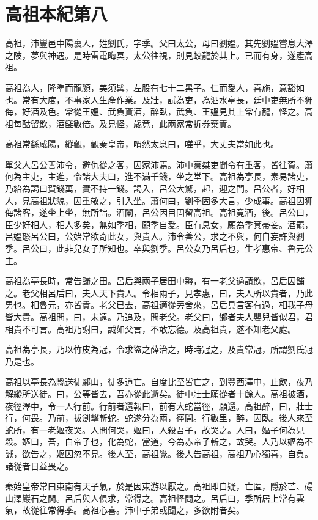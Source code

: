 \chapter{高祖本紀第八}

高祖，沛豐邑中陽裏人，姓劉氏，字季。父曰太公，母曰劉媼。其先劉媼嘗息大澤之陂，夢與神遇。是時雷電晦冥，太公往視，則見蛟龍於其上。已而有身，遂產高祖。

高祖為人，隆準而龍顏，美須髯，左股有七十二黑子。仁而愛人，喜施，意豁如也。常有大度，不事家人生產作業。及壯，試為吏，為泗水亭長，廷中吏無所不狎侮，好酒及色。常從王媼、武負貰酒，醉臥，武負、王媼見其上常有龍，怪之。高祖每酤留飲，酒讎數倍。及見怪，歲竟，此兩家常折券棄責。

高祖常繇咸陽，縱觀，觀秦皇帝，喟然太息曰，嗟乎，大丈夫當如此也。

單父人呂公善沛令，避仇從之客，因家沛焉。沛中豪桀吏聞令有重客，皆往賀。蕭何為主吏，主進，令諸大夫曰，進不滿千錢，坐之堂下。高祖為亭長，素易諸吏，乃紿為謁曰賀錢萬，實不持一錢。謁入，呂公大驚，起，迎之門。呂公者，好相人，見高祖狀貌，因重敬之，引入坐。蕭何曰，劉季固多大言，少成事。高祖因狎侮諸客，遂坐上坐，無所詘。酒闌，呂公因目固留高祖。高祖竟酒，後。呂公曰，臣少好相人，相人多矣，無如季相，願季自愛。臣有息女，願為季箕帚妾。酒罷，呂媼怒呂公曰，公始常欲奇此女，與貴人。沛令善公，求之不與，何自妄許與劉季。呂公曰，此非兒女子所知也。卒與劉季。呂公女乃呂后也，生孝惠帝、魯元公主。

高祖為亭長時，常告歸之田。呂后與兩子居田中耨，有一老父過請飲，呂后因餔之。老父相呂后曰，夫人天下貴人。令相兩子，見孝惠，曰，夫人所以貴者，乃此男也。相魯元，亦皆貴。老父已去，高祖適從旁舍來，呂后具言客有過，相我子母皆大貴。高祖問，曰，未遠。乃追及，問老父。老父曰，鄉者夫人嬰兒皆似君，君相貴不可言。高祖乃謝曰，誠如父言，不敢忘德。及高祖貴，遂不知老父處。

高祖為亭長，乃以竹皮為冠，令求盜之薛治之，時時冠之，及貴常冠，所謂劉氏冠乃是也。

高祖以亭長為縣送徒酈山，徒多道亡。自度比至皆亡之，到豐西澤中，止飲，夜乃解縱所送徒。曰，公等皆去，吾亦從此逝矣。徒中壯士願從者十餘人。高祖被酒，夜徑澤中，令一人行前。行前者還報曰，前有大蛇當徑，願還。高祖醉，曰，壯士行，何畏。乃前，拔劍擊斬蛇。蛇遂分為兩，徑開。行數里，醉，因臥。後人來至蛇所，有一老嫗夜哭。人問何哭，嫗曰，人殺吾子，故哭之。人曰，嫗子何為見殺。嫗曰，吾，白帝子也，化為蛇，當道，今為赤帝子斬之，故哭。人乃以嫗為不誠，欲告之，嫗因忽不見。後人至，高祖覺。後人告高祖，高祖乃心獨喜，自負。諸從者日益畏之。

秦始皇帝常曰東南有天子氣，於是因東游以厭之。高祖即自疑，亡匿，隱於芒、碭山澤巖石之閒。呂后與人俱求，常得之。高祖怪問之。呂后曰，季所居上常有雲氣，故從往常得季。高祖心喜。沛中子弟或聞之，多欲附者矣。

